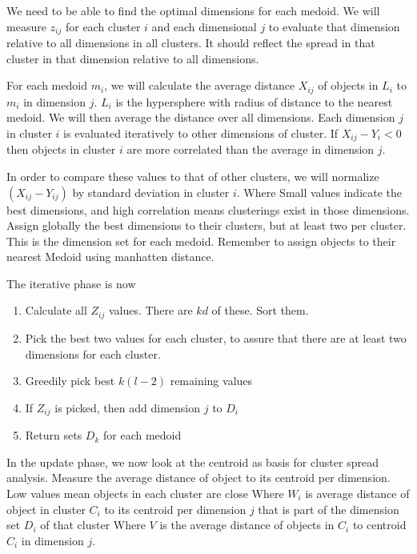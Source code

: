    We need to be able to find the optimal dimensions for each medoid. We will measure $z_{ij}$ for each cluster $i$ and each dimensional $j$ to evaluate that dimension relative to all dimensions in all clusters. It should reflect the spread in that cluster in that dimension relative to all dimensions. 
   
   For each medoid $m_i$, we will calculate the average distance $X_{ij}$ of objects in $L_i$ to $m_i$ in dimension $j$. $L_i$ is the hypersphere with radius of distance to the nearest medoid. We will then average the distance over all dimensions. 
   Each dimension $j$ in cluster $i$ is evaluated iteratively to other dimensions of cluster. If $X_{ij} - Y_{i} < 0$ then objects in cluster $i$ are more correlated than the average in dimension $j$. 
   
   In order to compare these values to that of other clusters, we will normalize $(X_{ij} - Y_{ij})$ by standard deviation in cluster $i$. 
   Where 
   Small values indicate the best dimensions, and high correlation means clusterings exist in those dimensions. Assign globally the best dimensions to their clusters, but at least two per cluster. This is the dimension set for each medoid. Remember to assign objects to their nearest Medoid using manhatten distance.
   
   The iterative phase is now 
   \begin{enumerate}
       \item Calculate all $Z_{ij}$ values. There are $kd$ of these. Sort them.
       \item Pick the best two values for each cluster, to assure that there are at least two dimensions for each cluster.
       \item Greedily pick best $k(l-2)$ remaining values
       \item If $Z_{ij}$ is picked, then add dimension $j$ to $D_i$
       \item Return sets $D_k$ for each medoid
       \end{enumerate}
       
     In the update phase, we now look at the centroid as basis for cluster spread analysis. Measure the average distance of object to its centroid per dimension. Low values mean objects in each cluster are close
     Where $W_i$ is average distance of object in cluster $C_i$ to its centroid per dimension $j$ that is part of the dimension set $D_i$ of that cluster
     Where $V$ is the average distance of objects in $C_i$ to centroid $C_i$ in dimension $j$.
     
